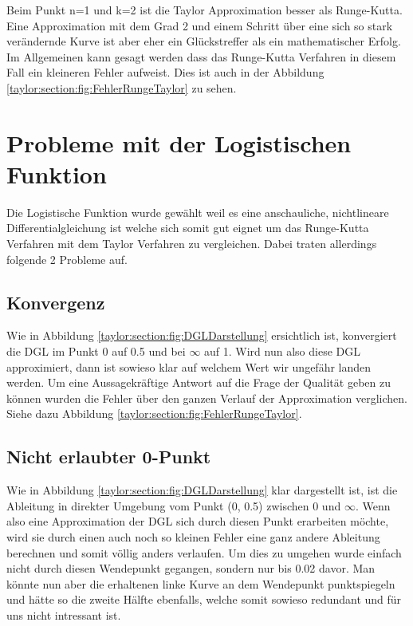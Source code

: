 Beim Punkt n=1 und k=2 ist die Taylor Approximation besser als Runge-Kutta.
Eine Approximation mit dem Grad 2 und einem Schritt über eine sich so stark verändernde Kurve ist aber eher ein Glückstreffer als ein mathematischer Erfolg.
Im Allgemeinen kann gesagt werden dass das Runge-Kutta Verfahren in diesem Fall ein kleineren Fehler aufweist. Dies ist auch in der Abbildung \ref{taylor:section:fig:FehlerRungeTaylor} zu sehen.

\section{Probleme mit der Logistischen Funktion}
\label{taylor:subsection:Probleme}
Die Logistische Funktion wurde gewählt weil es eine anschauliche, nichtlineare Differentialgleichung ist welche sich somit gut eignet um das Runge-Kutta Verfahren mit dem Taylor Verfahren zu vergleichen.
Dabei traten allerdings folgende 2 Probleme auf.

\subsection{Konvergenz}
\label{taylor:subsection:Konvergenz}
Wie in Abbildung 
\ref{taylor:section:fig:DGLDarstellung}
ersichtlich ist, konvergiert die DGL im Punkt 0 auf 0.5 und bei $\infty$ auf 1.
Wird nun also diese DGL approximiert, dann ist sowieso klar auf welchem Wert wir ungefähr landen werden.
Um eine Aussagekräftige Antwort auf die Frage der Qualität geben zu können wurden die Fehler über den ganzen Verlauf der Approximation verglichen. Siehe dazu Abbildung \ref{taylor:section:fig:FehlerRungeTaylor}.

\subsection{Nicht erlaubter 0-Punkt}
\label{taylor:subsection:0Punkt}
Wie in Abbildung 
\ref{taylor:section:fig:DGLDarstellung}
klar dargestellt ist, ist die Ableitung in direkter Umgebung vom Punkt (0, 0.5) zwischen 0 und $\infty$.
Wenn also eine Approximation der DGL sich durch diesen Punkt erarbeiten möchte, wird sie durch einen auch noch so kleinen Fehler eine ganz andere Ableitung berechnen und somit völlig anders verlaufen.
Um dies zu umgehen wurde einfach nicht durch diesen Wendepunkt gegangen, sondern nur bis 0.02 davor.
Man könnte nun aber die erhaltenen linke Kurve an dem Wendepunkt punktspiegeln und hätte so die zweite Hälfte ebenfalls, welche somit sowieso redundant und für uns nicht intressant ist.



